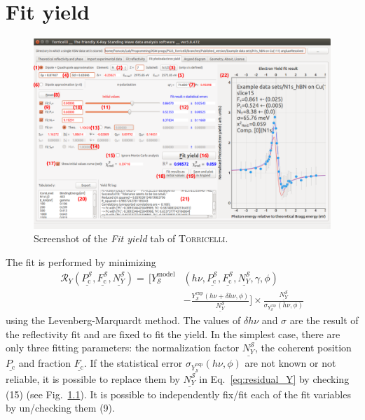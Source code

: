 \documentclass[oldfontcommands,openany,oneside]{memoir}
\begin{document}
\chapter{Fit yield} \label{chap:FitYield}
\begin{figure}[!b]
  \centering
  \includegraphics[width=1.2\textwidth]{img/Screenshot_FitYield.pdf}
  \caption{Screenshot of the \emph{Fit yield} tab of \textsc{Torricelli}.}
  \label{fig:yield}
\end{figure}

The fit is performed by minimizing
\begin{align} \label{eq:residual_Y}
  \mathcal{R}_Y(\underline{P_\mathrm{c}^\mathscr{S}}, \underline{F_\mathrm{c}^\mathscr{S}}, \underline{N_Y^\mathscr{S}})  = \, \bigg[Y^\mathrm{model}_\mathscr{S}& \left(h\nu, \underline{P_\mathrm{c}^\mathscr{S}}, \underline{F_\mathrm{c}^\mathscr{S}}, \underline{N_Y^\mathscr{S}}, \gamma, \phi\right) \nonumber \\
  & - \frac{Y^\mathrm{exp}_\mathscr{S}(h\nu+ \delta h\nu, \phi)}{\underline{N_Y^\mathscr{S}}}\bigg]\times\frac{\underline{N_Y^\mathscr{S}}}{\sigma_{Y^\mathrm{exp}_\mathscr{S}}(h\nu, \phi)}
\end{align}
using the Levenberg-Marquardt method. The values of $\delta h\nu$ and $\sigma$ are the result of the reflectivity fit and are fixed to fit the yield. In the simplest case, there are only three fitting parameters: the normalization factor $\underline{N_Y^\mathscr{S}}$, the coherent position $\underline{P_\mathrm{c}}$ and fraction $\underline{F_\mathrm{c}}$. If the statistical error $\sigma_{Y^\mathrm{exp}_\mathscr{S}}(h\nu, \phi)$ are not known or not reliable, it is possible to replace them by $\underline{N_Y^\mathscr{S}}$ in Eq.~\ref{eq:residual_Y} by checking  (15) (see Fig.~\ref{fig:yield}). It is possible to independently fix/fit each of the fit variables by un/checking them (9).
\end{document}

